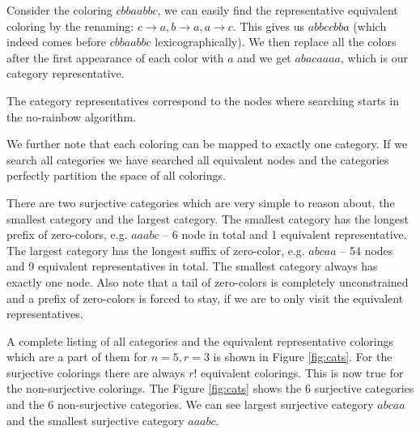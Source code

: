 \documentclass{book}
\theoremstyle{definition}
\begin{document}
Consider the coloring $cbbaabbc$, we can easily find the representative equivalent coloring by the renaming: $c \rightarrow a, b \rightarrow a, a \rightarrow c$. This gives us $abbccbba$ (which indeed comes before $cbbaabbc$ lexicographically). We then replace all the colors after the first appearance of each color with $a$ and we get $abacaaaa$, which is our category representative.

The category representatives correspond to the nodes where searching starts in the no-rainbow algorithm.

We further note that each coloring can be mapped to exactly one category. If we search all categories we have searched all equivalent nodes and the categories perfectly partition the space of all colorings.

There are two surjective categories which are very simple to reason about, the smallest category and the largest category. The smallest category has the longest prefix of zero-colors, e.g. $aaabc$ -- 6 node in total and 1 equivalent representative. The largest category has the longest suffix of zero-color, e.g. $abcaa$ -- 54 nodes and 9 equivalent representatives in total. The smallest category always has exactly one node. Also note that a tail of zero-colors is completely unconstrained and a prefix of zero-colors is forced to stay, if we are to only visit the equivalent representatives.

A complete listing of all categories and the equivalent representative colorings which are a part of them for $n=5, r=3$ is shown in Figure \ref{fig:cats}. For the surjective colorings there are always $r!$ equivalent colorings. This is now true for the non-surjective colorings. The Figure \ref{fig:cats} shows the 6 surjective categories and the 6 non-surjective categories. We can see largest surjective category $abcaa$ and the smallest surjective category $aaabc$.
\end{document}
